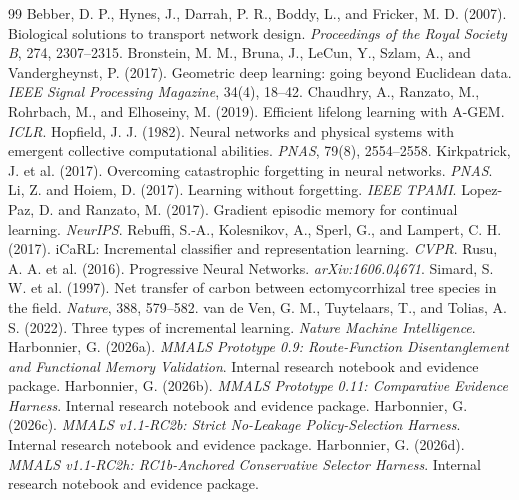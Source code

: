 \documentclass[11pt]{article}
\begin{document}
\begin{thebibliography}{99}
 Bebber, D. P., Hynes, J., Darrah, P. R., Boddy, L., and Fricker, M. D. (2007). Biological solutions to transport network design. \emph{Proceedings of the Royal Society B}, 274, 2307--2315.
 Bronstein, M. M., Bruna, J., LeCun, Y., Szlam, A., and Vandergheynst, P. (2017). Geometric deep learning: going beyond Euclidean data. \emph{IEEE Signal Processing Magazine}, 34(4), 18--42.
 Chaudhry, A., Ranzato, M., Rohrbach, M., and Elhoseiny, M. (2019). Efficient lifelong learning with A-GEM. \emph{ICLR}.
 Hopfield, J. J. (1982). Neural networks and physical systems with emergent collective computational abilities. \emph{PNAS}, 79(8), 2554--2558.
 Kirkpatrick, J. et al. (2017). Overcoming catastrophic forgetting in neural networks. \emph{PNAS}.
 Li, Z. and Hoiem, D. (2017). Learning without forgetting. \emph{IEEE TPAMI}.
 Lopez-Paz, D. and Ranzato, M. (2017). Gradient episodic memory for continual learning. \emph{NeurIPS}.
 Rebuffi, S.-A., Kolesnikov, A., Sperl, G., and Lampert, C. H. (2017). iCaRL: Incremental classifier and representation learning. \emph{CVPR}.
 Rusu, A. A. et al. (2016). Progressive Neural Networks. \emph{arXiv:1606.04671}.
 Simard, S. W. et al. (1997). Net transfer of carbon between ectomycorrhizal tree species in the field. \emph{Nature}, 388, 579--582.
 van de Ven, G. M., Tuytelaars, T., and Tolias, A. S. (2022). Three types of incremental learning. \emph{Nature Machine Intelligence}.
 Harbonnier, G. (2026a). \emph{MMALS Prototype 0.9: Route-Function Disentanglement and Functional Memory Validation}. Internal research notebook and evidence package.
 Harbonnier, G. (2026b). \emph{MMALS Prototype 0.11: Comparative Evidence Harness}. Internal research notebook and evidence package.
 Harbonnier, G. (2026c). \emph{MMALS v1.1-RC2b: Strict No-Leakage Policy-Selection Harness}. Internal research notebook and evidence package.
 Harbonnier, G. (2026d). \emph{MMALS v1.1-RC2h: RC1b-Anchored Conservative Selector Harness}. Internal research notebook and evidence package.
\end{thebibliography}
\end{document}

